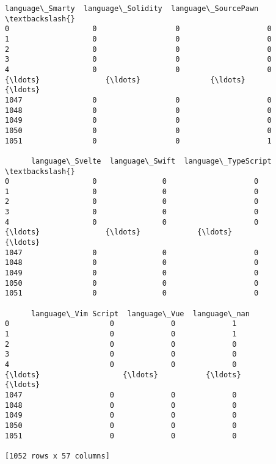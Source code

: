 \documentclass[11pt]{article}
\begin{document}
\begin{tcolorbox}[breakable, size=fbox, boxrule=.5pt, pad at break*=1mm, opacityfill=0]
\begin{Verbatim}[commandchars=\\\{\}]
      language\_Smarty  language\_Solidity  language\_SourcePawn  \textbackslash{}
0                   0                  0                    0
1                   0                  0                    0
2                   0                  0                    0
3                   0                  0                    0
4                   0                  0                    0
{\ldots}               {\ldots}                {\ldots}                  {\ldots}
1047                0                  0                    0
1048                0                  0                    0
1049                0                  0                    0
1050                0                  0                    0
1051                0                  0                    1

      language\_Svelte  language\_Swift  language\_TypeScript  \textbackslash{}
0                   0               0                    0
1                   0               0                    0
2                   0               0                    0
3                   0               0                    0
4                   0               0                    0
{\ldots}               {\ldots}             {\ldots}                  {\ldots}
1047                0               0                    0
1048                0               0                    0
1049                0               0                    0
1050                0               0                    0
1051                0               0                    0

      language\_Vim Script  language\_Vue  language\_nan
0                       0             0             1
1                       0             0             1
2                       0             0             0
3                       0             0             0
4                       0             0             0
{\ldots}                   {\ldots}           {\ldots}           {\ldots}
1047                    0             0             0
1048                    0             0             0
1049                    0             0             0
1050                    0             0             0
1051                    0             0             0

[1052 rows x 57 columns]
\end{Verbatim}
\end{tcolorbox}
        
\end{document}
